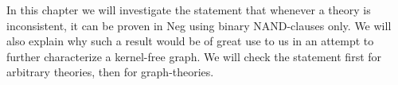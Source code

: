 In this chapter we will investigate the statement that whenever a theory is inconsistent, it can be proven in Neg using binary NAND-clauses only.
We will also explain why such a result would be of great use to us in an attempt to further characterize a kernel-free graph.
We will check the statement first for arbitrary theories, then for graph-theories.
